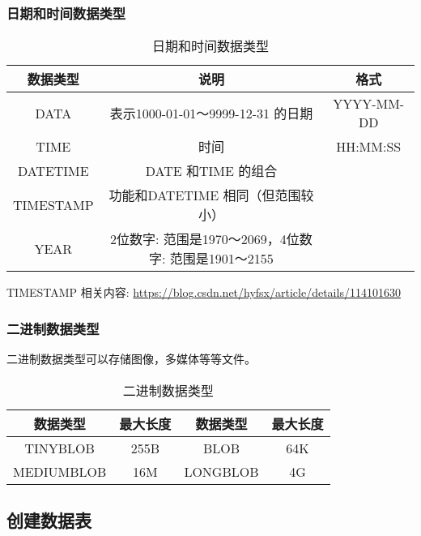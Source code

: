 \subsubsection{日期和时间数据类型}

\begin{table}[H]
    \small
    \centering
    \caption{日期和时间数据类型}
    \label{table:日期和时间数据类型}
    \setlength{\tabcolsep}{4mm}
    \begin{tabular}{c|c|c}
        \toprule
        \textbf{数据类型} & \textbf{说明} & \textbf{格式} \\
        \midrule
        DATA & 表示1000-01-01～9999-12-31 的日期 & YYYY-MM-DD \\
        TIME & 时间 & HH:MM:SS \\
        DATETIME & DATE 和TIME 的组合 &  \\
        TIMESTAMP & 功能和DATETIME 相同（但范围较小） &  \\
        YEAR & 2位数字: 范围是1970～2069，4位数字: 范围是1901～2155 &  \\
        \bottomrule
    \end{tabular}
\end{table}

TIMESTAMP 相关内容: \url{https://blog.csdn.net/hyfsx/article/details/114101630}

\subsubsection{二进制数据类型}

二进制数据类型可以存储图像，多媒体等等文件。

\begin{table}[H]    
    \small
    \centering
    \caption{二进制数据类型}
    \label{table:二进制数据类型}
    \setlength{\tabcolsep}{4mm}
    \begin{tabular}{c|ccc}
        \toprule
        \textbf{数据类型} & \textbf{最大长度} & \textbf{数据类型} & \textbf{最大长度} \\
        \midrule
        TINYBLOB & 255B & BLOB & 64K \\
        MEDIUMBLOB & 16M & LONGBLOB & 4G \\
        \bottomrule
    \end{tabular}
\end{table}

\subsection{创建数据表}

